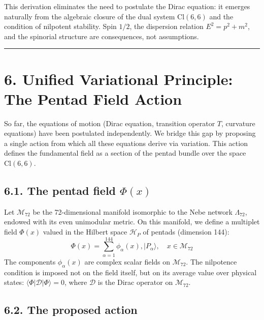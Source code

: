 \documentclass[11pt]{article}
\let\oldmathcal\mathcal
\renewcommand{\mathcal}[1]{\oldmathcal{#1}}
\begin{document}
This derivation eliminates the need to postulate the Dirac equation: it
emerges naturally from the algebraic closure of the dual system
\(\text{Cl}(6,6)\) and the condition of nilpotent stability. Spin
\(1/2\), the dispersion relation \(E^2 = p^2 + m^2\), and the spinorial
structure are consequences, not assumptions.

\begin{center}\rule{0.5\linewidth}{0.5pt}\end{center}

\hypertarget{unified-variational-principle-the-pentad-field-action}{%
\section{6. Unified Variational Principle: The Pentad Field
Action}\label{unified-variational-principle-the-pentad-field-action}}

So far, the equations of motion (Dirac equation, transition operator
\(T\), curvature equations) have been postulated independently. We
bridge this gap by proposing a single action from which all these
equations derive via variation. This action defines the fundamental
field as a section of the pentad bundle over the space
\(\text{Cl}(6,6)\).

\hypertarget{the-pentad-field-phix}{%
\subsection{\texorpdfstring{6.1. The pentad field
\(\Phi(x)\)}{6.1. The pentad field \textbackslash Phi(x)}}\label{the-pentad-field-phix}}

Let \(\mathcal{M}_{72}\) be the 72-dimensional manifold isomorphic to
the Nebe network \(\Lambda_{72}\), endowed with its even unimodular
metric. On this manifold, we define a multiplet field \(\Phi(x)\) valued
in the Hilbert space \(\mathcal{H}_P\) of pentads (dimension 144): \[
\Phi(x) = \sum_{\alpha=1}^{144} \phi_\alpha(x) , |P_\alpha\rangle, \quad x \in \mathcal{M}_{72}
\] The components \(\phi_\alpha(x)\) are complex scalar fields on
\(\mathcal{M}_{72}\). The nilpotence condition is imposed not on the
field itself, but on its average value over physical states:
\(\langle \Phi | \mathcal{D} | \Phi \rangle = 0\), where \(\mathcal{D}\)
is the Dirac operator on \(\mathcal{M}_{72}\).

\hypertarget{the-proposed-action}{%
\subsection{6.2. The proposed action}\label{the-proposed-action}}
\end{document}
